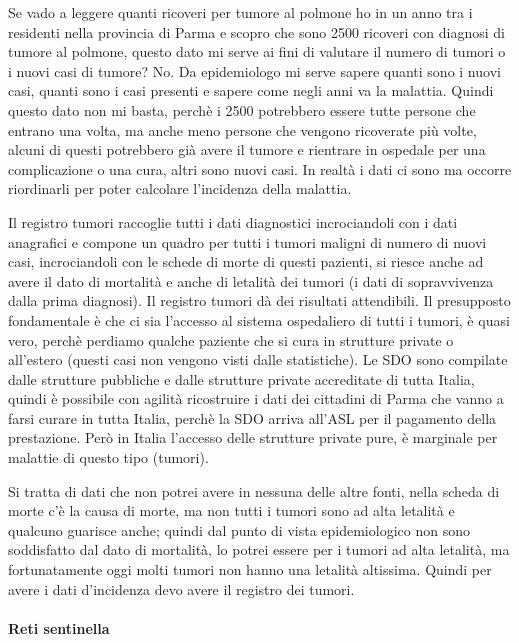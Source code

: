 Se vado a leggere quanti ricoveri per tumore al polmone ho in un anno
tra i residenti nella provincia di Parma e scopro che sono 2500 ricoveri
con diagnosi di tumore al polmone, questo dato mi serve ai fini di
valutare il numero di tumori o i nuovi casi di tumore? No. Da
epidemiologo mi serve sapere quanti sono i nuovi casi, quanti sono i
casi presenti e sapere come negli anni va la malattia. Quindi questo
dato non mi basta, perchè i 2500 potrebbero essere tutte persone che
entrano una volta, ma anche meno persone che vengono ricoverate più
volte, alcuni di questi potrebbero già avere il tumore e rientrare in
ospedale per una complicazione o una cura, altri sono nuovi casi. In
realtà i dati ci sono ma occorre riordinarli per poter calcolare
l'incidenza della malattia.

Il registro tumori raccoglie tutti i dati diagnostici incrociandoli con
i dati anagrafici e compone un quadro per tutti i tumori maligni di
numero di nuovi casi, incrociandoli con le schede di morte di questi
pazienti, si riesce anche ad avere il dato di mortalità e anche di
letalità dei tumori (i dati di sopravvivenza dalla prima diagnosi). Il
registro tumori dà dei risultati attendibili. Il presupposto
fondamentale è che ci sia l'accesso al sistema ospedaliero di tutti i
tumori, è quasi vero, perchè perdiamo qualche paziente che si cura in
strutture private o all'estero (questi casi non vengono visti dalle
statistiche). Le SDO sono compilate dalle strutture pubbliche e dalle
strutture private accreditate di tutta Italia, quindi è possibile con
agilità ricostruire i dati dei cittadini di Parma che vanno a farsi
curare in tutta Italia, perchè la SDO arriva all'ASL per il pagamento
della prestazione. Però in Italia l'accesso delle strutture private
pure, è marginale per malattie di questo tipo (tumori).

Si tratta di dati che non potrei avere in nessuna delle altre fonti,
nella scheda di morte c'è la causa di morte, ma non tutti i tumori sono
ad alta letalità e qualcuno guarisce anche; quindi dal punto di vista
epidemiologico non sono soddisfatto dal dato di mortalità, lo potrei
essere per i tumori ad alta letalità, ma fortunatamente oggi molti
tumori non hanno una letalità altissima. Quindi per avere i dati
d'incidenza devo avere il registro dei tumori.

\paragraph{Reti sentinella}



